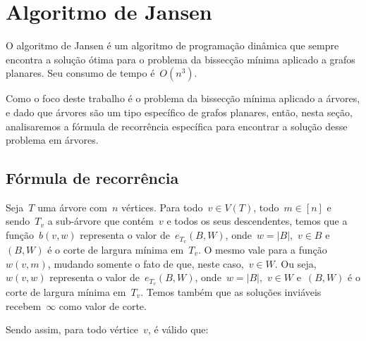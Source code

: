 \section {Algoritmo de Jansen}

O algoritmo de Jansen é um algoritmo de 
programação dinâmica que sempre encontra
a solução ótima para o problema da bissecção
mínima aplicado a grafos planares.
Seu consumo de tempo é~$O(n^3)$.

Como o foco deste trabalho é o problema da 
bissecção mínima aplicado a árvores, e dado
que árvores são um tipo específico de grafos
planares, então, nesta seção, analisaremos a 
fórmula de recorrência específica para encontrar
a solução desse problema em árvores. 

\bigskip
\bigskip

\subsection*{Fórmula de recorrência}

Seja~$T$ uma árvore com~$n$ vértices. 
Para todo~${v\in V(T)}$, todo~${m\in[n]}$
e sendo~$T_v$ a sub-árvore que contém~$v$
e todos os seus descendentes,
temos que a função~$b(v,w)$ representa o valor
de~$e_{T_v}(B,W)$, onde~${w=|B|}$,~${v\in B}$
e~$(B,W)$ é o corte de largura mínima em~$T_v$.
O mesmo vale para a função~$w(v,m)$, mudando somente
o fato de que, neste caso,~$v\in W$.
Ou seja,~$w(v,w)$ representa o valor
de~$e_{T_v}(B,W)$, onde~${w=|B|}$,~${v\in W}$
e~$(B,W)$ é o corte de largura mínima em~$T_v$.
Temos também que as soluções inviáveis recebem~$\infty$
como valor de corte.

Sendo assim, para todo vértice~$v$, é válido que:

